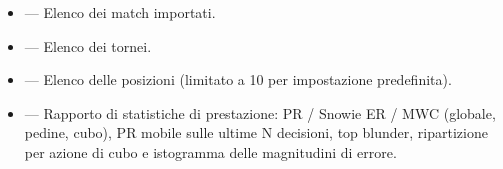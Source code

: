 \documentclass[letterpaper,10pt,italian]{sphinxmanual}
\begin{document}
\sphinxAtStartPar
{}
\begin{itemize}
\item {} 
\sphinxAtStartPar
{} — Elenco dei match importati.

\item {} 
\sphinxAtStartPar
{} — Elenco dei tornei.

\item {} 
\sphinxAtStartPar
{} — Elenco delle posizioni (limitato a 10 per impostazione predefinita).

\item {} 
\sphinxAtStartPar
{} — Rapporto di statistiche di prestazione: PR / Snowie ER / MWC (globale, pedine, cubo), PR mobile sulle ultime N decisioni, top blunder, ripartizione per azione di cubo e istogramma delle magnitudini di errore.

\end{itemize}
\end{document}
